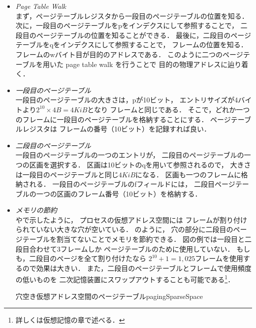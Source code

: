 \begin{itemize}
\item \emph{Page Table Walk} \\
まず，ページテーブルレジスタから一段目のページテーブルの位置を知る．
次に，一段目のページテーブルをpをインデクスにして参照することで，
二段目のページテーブルの位置を知ることができる．
最後に，二段目のページテーブルをqをインデクスにして参照することで，
フレームの位置を知る．
フレームのwバイト目が目的のアドレスである．
このように二つのページテーブルを用いた page table walk を行うことで
目的の物理アドレスに辿り着く．

\item \emph{一段目のページテーブル} \\
一段目のページテーブルの大きさは，pが10ビット，
エントリサイズが4バイトより$2^{10} \times 4B =4KiB$となり
フレームと同じである．
そこで，どれか一つのフレームに一段目のページテーブルを格納することにする．
ページテーブルレジスタは
フレームの番号（10ビット）を記録すれば良い．

\item \emph{二段目のページテーブル} \\
一段目のページテーブルの一つのエントリが，
二段目のページテーブルの一つの区画を選択する．
区画は10ビットのqを用いて参照されるので，
大きさは一段目のページテーブルと同じ$4KiB$になる．
区画も一つのフレームに格納される．
一段目のページテーブルのfフィールドには，
二段目ページテーブルの一つの区画のフレーム番号（10ビット）を格納する．

\item \emph{メモリの節約}\\
やで示したように，
プロセスの仮想アドレス空間には
フレームが割り付けられていない大きな穴が空いている．
のように，
穴の部分に二段目のページテーブルを割当てないことでメモリを節約できる．
図の例では一段目と二段目合わせて3フレームしか
ページテーブルのために使用していない．
もしも，二段目のページを全て割り付けたなら
$2^{10}+1=1,025$フレームを使用するので効果は大きい．
また，二段目のページテーブルとフレームで使用頻度の低いものを
二次記憶装置にスワップアウトすることも可能である\footnote{
詳しくは仮想記憶の章で述べる．}．

{穴空き仮想アドレス空間のページテーブル}{pagingSparseSpace}
\end{itemize}

